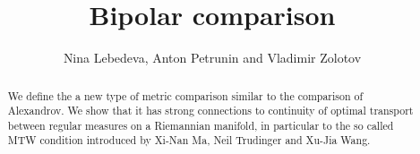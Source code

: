\documentclass{article}
\begin{document}
\title{Bipolar comparison}
\author{Nina Lebedeva, Anton Petrunin and Vladimir Zolotov}



\newcommand{\Addresses}{{\bigskip\footnotesize

  Nina Lebedeva, \par\nopagebreak
  \textsc{Steklov Institute,
27 Fontanka, St. Petersburg, 
191023, Russia.}
  \par\nopagebreak
  \textit{Email}: \texttt{lebed@pdmi.ras.ru}

\medskip

  Anton Petrunin, \par\nopagebreak\textsc{Math. Dept. PSU, University Park, PA 16802, USA.}
  \par\nopagebreak
  \textit{Email}: \texttt{petrunin@math.psu.edu}
  
\medskip

Vladimir Zolotov, \par\nopagebreak\textsc{Steklov Institute,
27 Fontanka, St. Petersburg, 
191023, Russia.}
  \par\nopagebreak
  \textit{Email}: \texttt{paranuel@mail.ru}
}}

\date{}

\maketitle

\begin{abstract}
We define the a new type of metric comparison similar to the comparison of Alexandrov.
We show that it has strong connections to continuity of optimal transport between regular measures on a Riemannian manifold, in particular to the so called MTW condition introduced by Xi-Nan Ma, Neil Trudinger and Xu-Jia Wang.

\end{abstract}








\end{document}
